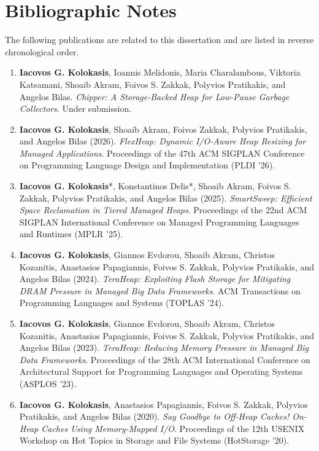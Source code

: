 \cleardoublepage

\chapter*{Bibliographic Notes}

The following publications are related to this dissertation and are listed in reverse chronological order.

\begin{enumerate}
	\item \textbf{Iacovos G. Kolokasis}, Ioannis Melidonis, Maria Charalambous, Viktoria Katsamani, Shoaib Akram, Foivos S. Zakkak, Polyvios Pratikakis, and Angelos Bilas.
	      \emph{Chipper: A Storage-Backed Heap for Low-Pause Garbage Collectors}.
	      Under submission.
	\item \textbf{Iacovos G. Kolokasis}, Shoaib Akram, Foivos Zakkak, Polyvios Pratikakis, and Angelos Bilas (2026).
	      \emph{FlexHeap: Dynamic I/O-Aware Heap Resizing for Managed Applications}.
	      Proceedings of the 47th ACM SIGPLAN Conference on Programming Language Design and Implementation (PLDI '26).
	\item \textbf{Iacovos G. Kolokasis}*, Konstantinos Delis*, Shoaib Akram, Foivos S. Zakkak, Polyvios Pratikakis, and Angelos Bilas (2025).
	      \emph{SmartSweep: Efficient Space Reclamation in Tiered Managed Heaps}.
	      Proceedings of the 22nd ACM SIGPLAN International Conference on Managed Programming Languages and Runtimes (MPLR '25).
	\item \textbf{Iacovos G. Kolokasis}, Giannos Evdorou, Shoaib Akram, Christos Kozanitis, Anastasios Papagiannis, Foivos S. Zakkak, Polyvios Pratikakis, and Angelos Bilas (2024).
	      \emph{TeraHeap: Exploiting Flash Storage for Mitigating DRAM Pressure in Managed Big Data Frameworks}.
	      ACM Transactions on Programming Languages and Systems (TOPLAS '24).
	\item \textbf{Iacovos G. Kolokasis}, Giannos Evdorou, Shoaib Akram, Christos Kozanitis, Anastasios Papagiannis, Foivos S. Zakkak, Polyvios Pratikakis, and Angelos Bilas (2023).
	      \emph{TeraHeap: Reducing Memory Pressure in Managed Big Data Frameworks}.
	      Proceedings of the 28th ACM International Conference on Architectural Support for Programming Languages and Operating Systems (ASPLOS '23).
	\item \textbf{Iacovos G. Kolokasis}, Anastasios Papagiannis, Foivos S. Zakkak, Polyvios Pratikakis, and Angelos Bilas (2020).
	      \emph{Say Goodbye to Off-Heap Caches! On-Heap Caches Using Memory-Mapped I/O}.
	      Proceedings of the 12th USENIX Workshop on Hot Topics in Storage and File Systems (HotStorage '20).
\end{enumerate}

